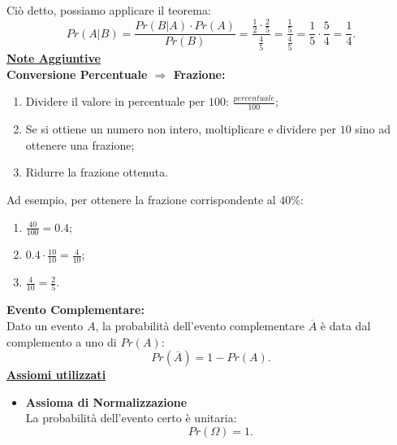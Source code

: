 \documentclass[12pt,oneside,openany]{memoir}
\numberwithin{equation}{subsection}
\begin{document}
Ci\`o detto, possiamo applicare il teorema:
\[
    Pr(A | B) = \frac{Pr(B | A) \cdot Pr(A)}{Pr(B)} = \frac{\frac{1}{2} \cdot
    \frac{2}{5}}{\frac{4}{5}} = \frac{\frac{1}{5}}{\frac{4}{5}} = \frac{1}{5}
    \cdot \frac{5}{4} = \frac{1}{4}.
\]
\bigbreak\noindent
\textbf{\underline{Note Aggiuntive}}\\
\textbf{Conversione Percentuale $\Longrightarrow$ Frazione:}\\
\begin{enumerate}
    \item Dividere il valore in percentuale per $100$:
        $\frac{percentuale}{100}$;
    \item Se si ottiene un numero non intero, moltiplicare e dividere per $10$
        sino ad ottenere una frazione;
    \item Ridurre la frazione ottenuta.
\end{enumerate}
Ad esempio, per ottenere la frazione corrispondente al $40 \%$:
\begin{enumerate}
    \item $\frac{40}{100} = 0.4$;
    \item $0.4 \cdot \frac{10}{10} = \frac{4}{10}$;
    \item $\frac{4}{10} = \frac{2}{5}$.
\end{enumerate}
\bigbreak\noindent
\textbf{Evento Complementare:}\\
Dato un evento $A$, la probabilit\`a dell'evento complementare $\overline{A}$
\`e data dal complemento a uno di $Pr(A)$:
\[
    Pr(\overline{A}) = 1 - Pr(A).
\]
\bigbreak\noindent
\textbf{\underline{Assiomi utilizzati}}
\begin{itemize}
    \item \textbf{Assioma di Normalizzazione}\\
        La probabilit\`a dell'evento certo \`e unitaria:
        \[
            Pr(\Omega) = 1.
        \]
\end{itemize}


\newpage
\end{document}
